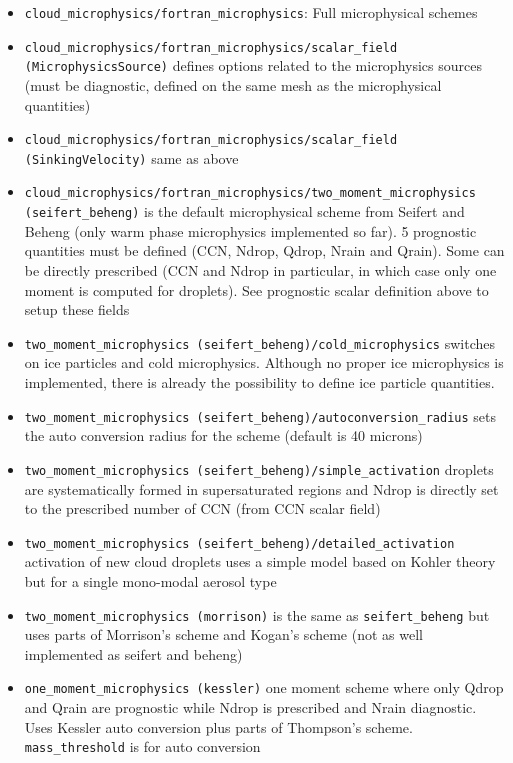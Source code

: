 \documentclass[10pt,a4paper]{article}
\begin{document}
\begin{itemize}
\item \texttt{cloud\_microphysics/fortran\_microphysics}: Full microphysical schemes
\item \texttt{cloud\_microphysics/fortran\_microphysics/scalar\_field (MicrophysicsSource)} defines options related to the microphysics sources (must be diagnostic, defined on the same mesh as the microphysical quantities)
\item \texttt{cloud\_microphysics/fortran\_microphysics/scalar\_field (SinkingVelocity)} same as above
\item \texttt{cloud\_microphysics/fortran\_microphysics/two\_moment\_microphysics (seifert\_beheng)} is the default microphysical scheme from Seifert and Beheng (only warm phase microphysics implemented so far). 5 prognostic quantities must be defined (CCN, Ndrop, Qdrop, Nrain and Qrain). Some can be directly prescribed (CCN and Ndrop in particular, in which case only one moment is computed for droplets). See prognostic scalar definition above to setup these fields
\item \texttt{two\_moment\_microphysics (seifert\_beheng)/cold\_microphysics} switches on ice particles and cold microphysics. Although no proper ice microphysics is implemented, there is already the possibility to define ice particle quantities.
\item \texttt{two\_moment\_microphysics (seifert\_beheng)/autoconversion\_radius} sets the auto conversion radius for the scheme (default is 40 microns)
\item \texttt{two\_moment\_microphysics (seifert\_beheng)/simple\_activation} droplets are systematically formed in supersaturated regions and Ndrop is directly set to the prescribed number of CCN (from CCN scalar field)
\item \texttt{two\_moment\_microphysics (seifert\_beheng)/detailed\_activation} activation of new cloud droplets uses a simple model based on Kohler theory but for a single  mono-modal aerosol type
\item \texttt{two\_moment\_microphysics (morrison)} is the same as \texttt{seifert\_beheng} but uses parts of Morrison’s scheme and Kogan’s scheme (not as well implemented as seifert and beheng)
\item \texttt{one\_moment\_microphysics (kessler)} one moment scheme where only Qdrop and Qrain are prognostic while Ndrop is prescribed and Nrain diagnostic. Uses Kessler auto conversion plus parts of Thompson’s scheme. \texttt{mass\_threshold} is for auto conversion 
\end{itemize}
\end{document}
